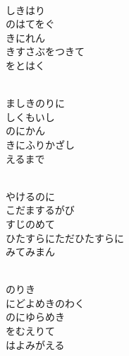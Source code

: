 \documentclass[10pt,b5j]{tarticle} %
\begin{document}
\vspace{1.5em} %
\newcommand{\linespace}{0.5em} %
\newcommand{\blocksize}{0.5\hsize} %
\newcommand{\itemmargin}{6em} %
\begin{enumerate} %
    \setlength{\itemindent}{\itemmargin} %
    \begin{minipage}[c]{\blocksize}
    
        \vspace{\linespace}
        \item~\\
        しきはり\\
        のはてをぐ\\
        きにれん\\
        きすさぶをつきて\\
        をとはく
        
        \vspace{\linespace}
        \item~\\
        ましきのりに\\
        しくもいし\\
        のにかん\\
        きにふりかざし\\
        えるまで
        
        \vspace{\linespace}
        \item~\\
        やけるのに\\
        こだまするがび\\
        すじのめて\\
        ひたすらにただひたすらに\\
        みてみまん
        
        \vspace{\linespace}
        \item~\\
        のりき\\
        にどよめきのわく\\
        のにゆらめき\\
        をむえりて\\
        はよみがえる
    
    \end{minipage}
\end{enumerate} %
\end{document}
